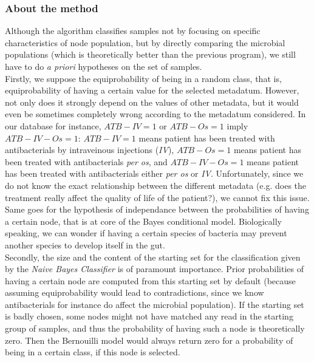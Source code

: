 \documentclass{report}
\begin{document}
\subsubsection{About the method}

Although the algorithm classifies samples not by focusing on specific characteristics of node population, but by directly comparing the microbial populations (which is theoretically better than the previous program), we still have to do \emph{a priori} hypotheses on the set of samples.\\

Firstly, we suppose the equiprobability of being in a random class, that is, equiprobability of having a certain value for the selected metadatum. However, not only does it strongly depend on the values of other metadata, but it would even be sometimes completely wrong according to the metadatum considered. In our database for instance, $ATB-IV = 1$ or $ATB-Os = 1$ imply $ATB-IV-Os = 1$: $ATB-IV = 1$ means patient has been treated with antibacterials by intraveinous injections (\emph{IV}), $ATB-Os = 1$ means patient has been treated with antibacterials \emph{per os}, and $ATB-IV-Os = 1$ means patient has been treated with antibacterials either \emph{per os} or \emph{IV}. Unfortunately, since we do not know the exact relationship between the different metadata (e.g. does the treatment really affect the quality of life of the patient?), we cannot fix this issue.\\

Same goes for the hypothesis of independance between the probabilities of having a certain node, that is at core of the Bayes conditional model. Biologically speaking, we can wonder if having a certain species of bacteria may prevent another species to develop itself in the gut.\\

Secondly, the size and the content of the starting set for the classification given by the \emph{Naive Bayes Classifier} is of paramount importance. Prior probabilities of having a certain node are computed from this starting set by default (because assuming equiprobability would lead to contradictions, since we know antibacterials for instance do affect the microbial population). If the starting set is badly chosen, some nodes might not have matched any read in the starting group of samples, and thus the probability of having such a node is theoretically zero. Then the Bernouilli model would always return zero for a probability of being in a certain class, if this node is selected.\\
\end{document}
